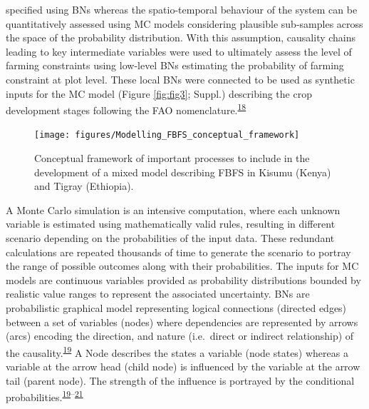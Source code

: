 \documentclass[12pt,oneside]{article}
\begin{document}
specified using BNs whereas the spatio-temporal behaviour of the system can be quantitatively assessed using MC models considering plausible sub-samples across the space of the probability distribution. With this assumption, causality chains leading to key intermediate variables were used to ultimately assess the level of farming constraints using low-level BNs estimating the probability of farming constraint at plot level. These local BNs were connected to be used as synthetic inputs for the MC model (Figure \ref{fig:fig3}; Suppl.) describing the crop development stages following the FAO nomenclature.\textsuperscript{\protect\hyperlink{ref-Allen_et_al_1998}{18}}

\begin{figure}[!htbp]

{\centering \texttt{[image: figures/Modelling\_FBFS\_conceptual\_framework]} 

}

\caption{Conceptual framework of important processes to include in the development of a mixed model describing FBFS in Kisumu (Kenya) and Tigray (Ethiopia).}\label{fig:fig2}
\end{figure}

A Monte Carlo simulation is an intensive computation, where each unknown variable is estimated using mathematically valid rules, resulting in different scenario depending on the probabilities of the input data. These redundant calculations are repeated thousands of time to generate the scenario to portray the range of possible outcomes along with their probabilities. The inputs for MC models are continuous variables provided as probability distributions bounded by realistic value ranges to represent the associated uncertainty. BNs are probabilistic graphical model representing logical connections (directed edges) between a set of variables (nodes) where dependencies are represented by arrows (arcs) encoding the direction, and nature (i.e.~direct or indirect relationship) of the causality.\textsuperscript{\protect\hyperlink{ref-Pearl_1988}{19}} A Node describes the states a variable (node states) whereas a variable at the arrow head (child node) is influenced by the variable at the arrow tail (parent node). The strength of the influence is portrayed by the conditional probabilities.\textsuperscript{\protect\hyperlink{ref-Pearl_1988}{19}--\protect\hyperlink{ref-Jensen_1996}{21}}
\end{document}

